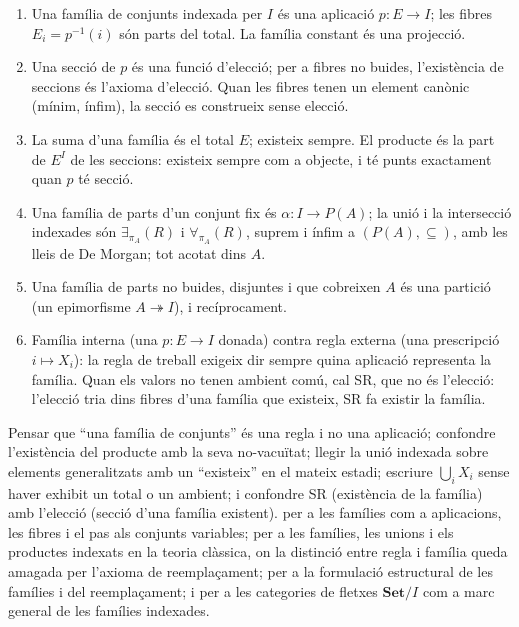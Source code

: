 \begin{resumcap}
\begin{enumerate}
  \item Una família de conjunts indexada per \(I\) és una aplicació \(p\colon E\to I\); les fibres \(E_i=p^{-1}(i)\) són parts del total. La família constant és una projecció.
  \item Una secció de \(p\) és una funció d'elecció; per a fibres no buides, l'existència de seccions és l'axioma d'elecció. Quan les fibres tenen un element canònic (mínim, ínfim), la secció es construeix sense elecció.
  \item La suma d'una família és el total \(E\); existeix sempre. El producte és la part de \(E^I\) de les seccions: existeix sempre com a objecte, i té punts exactament quan \(p\) té secció.
  \item Una família de parts d'un conjunt fix és \(\alpha\colon I\to P(A)\); la unió i la intersecció indexades són \(\exists_{\pi_A}(R)\) i \(\forall_{\pi_A}(R)\), suprem i ínfim a \((P(A),\subseteq)\), amb les lleis de De Morgan; tot acotat dins \(A\).
  \item Una família de parts no buides, disjuntes i que cobreixen \(A\) és una partició (un epimorfisme \(A\twoheadrightarrow I\)), i recíprocament.
  \item Família interna (una \(p\colon E\to I\) donada) contra regla externa (una prescripció \(i\mapsto X_i\)): la regla de treball exigeix dir sempre quina aplicació representa la família. Quan els valors no tenen ambient comú, cal SR, que no és l'elecció: l'elecció tria dins fibres d'una família que existeix, SR fa existir la família.
\end{enumerate}
 Pensar que \enquote{una família de conjunts} és una regla i no una aplicació; confondre l'existència del producte amb la seva no-vacuïtat; llegir la unió indexada sobre elements generalitzats amb un \enquote{existeix} en el mateix estadi; escriure \(\bigcup_iX_i\) sense haver exhibit un total o un ambient; i confondre SR (existència de la família) amb l'elecció (secció d'una família existent).
 \cite[cap.~8 i §§9.1--9.2]{lawvere-rosebrugh} per a les famílies com a aplicacions, les fibres i el pas als conjunts variables; \cite[§§9--10]{halmos} per a les famílies, les unions i els productes indexats en la teoria clàssica, on la distinció entre regla i família queda amagada per l'axioma de reemplaçament; \cite[§§2--3]{shulman-comparing} per a la formulació estructural de les famílies i del reemplaçament; i \cite[cap.~I]{maclane-moerdijk} per a les categories de fletxes \(\mathbf{Set}/I\) com a marc general de les famílies indexades.
\end{resumcap}
